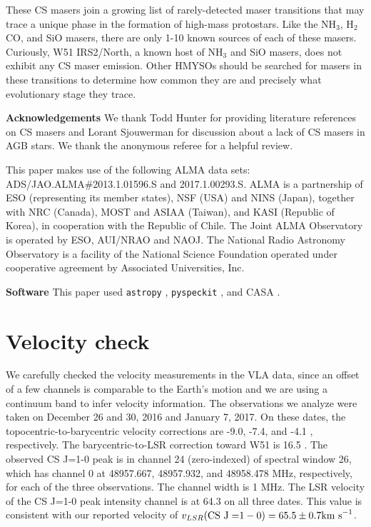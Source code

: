 \documentclass[twocolumn]{aastex62}
\begin{document}
These CS masers join a growing list of rarely-detected maser transitions
that may trace a unique phase in the formation of high-mass protostars.
Like the NH$_3$, H$_2$CO, and SiO masers, there are only 1-10 known sources of
each of these masers.  Curiously, W51 IRS2/North, a known host of NH$_3$ and SiO masers,
does not exhibit any CS maser emission.  Other HMYSOs should be searched for
masers in these transitions to determine how common they are and precisely
what evolutionary stage they trace.

\textbf{Acknowledgements}
We thank Todd Hunter for providing literature references on CS masers and
Lorant Sjouwerman for discussion about a lack of CS masers in AGB stars.
We thank the anonymous referee for a helpful review.

This paper makes use of the following ALMA data sets:
ADS/JAO.ALMA\#2013.1.01596.S and 2017.1.00293.S. ALMA is a partnership of ESO
(representing its member states), NSF (USA) and NINS (Japan), together with NRC
(Canada), MOST and ASIAA (Taiwan), and KASI (Republic of Korea), in cooperation
with the Republic of Chile. The Joint ALMA Observatory is operated by ESO,
AUI/NRAO and NAOJ.  The National Radio Astronomy Observatory is a facility of
the National Science Foundation operated under cooperative agreement by
Associated Universities, Inc.



\textbf{Software}
This paper used \texttt{astropy}
\citep{Astropy-Collaboration2013a,Astropy-Collaboration2018a},
\texttt{pyspeckit} \citep{Ginsburg2011c}, and CASA \citep{McMullin2007a}.

\appendix
\section{Velocity check}
We carefully checked the velocity measurements in the VLA data, since an offset
of a few channels is comparable to the Earth's motion and we are using a
continuum band to infer velocity information.  The observations we analyze were
taken on December 26 and 30, 2016 and January 7, 2017.  On these dates, the
topocentric-to-barycentric velocity corrections are -9.0, -7.4, and -4.1 \kms,
respectively.  The barycentric-to-LSR correction toward W51 is 16.5 \kms.  The
observed CS J=1-0 peak is in channel 24 (zero-indexed) of spectral window 26,
which has channel 0 at  48957.667, 48957.932, and 48958.478 MHz, respectively,
for each of the three observations.  The channel width is 1 MHz.  The LSR
velocity of the CS J=1-0 peak intensity channel is at 64.3 \kms on all three
dates.  This value is consistent with our reported velocity of
$v_{LSR}(\mathrm{CS~J=}1-0) = 65.5 \pm 0.7 \textrm{km~s}^{-1}$.
\end{document}
